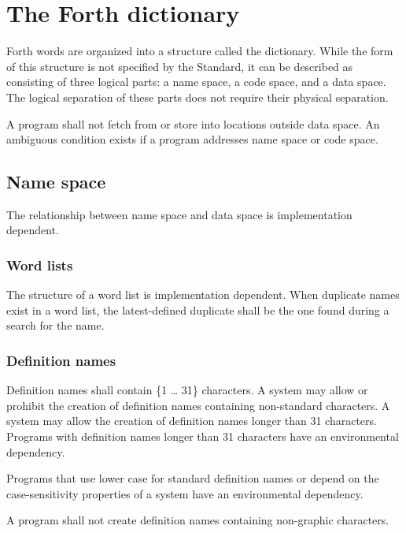 \section{The Forth dictionary} %
\label{usage:dict}

Forth words are organized into a structure called the dictionary.
While the form of this structure is not specified by the Standard,
it can be described as consisting of three logical parts:
a name space, a code space, and a data space. The logical separation
of these parts does not require their physical separation.

A program shall not fetch from or store into locations outside data
space. An ambiguous condition exists if a program addresses name
space or code space.

\subsection{Name space} %

The relationship between name space and data space is implementation
dependent.

\subsubsection{Word lists} %

The structure of a word list is implementation dependent. When
duplicate names exist in a word list, the latest-defined duplicate
shall be the one found during a search for the name.

\subsubsection{Definition names} %
\label{usage:names}

Definition names shall contain \{1 {\ldots} 31\} characters.
A system may allow or prohibit the creation of definition names
containing non-standard characters.  A system may allow the creation
of definition names longer than 31 characters.  Programs with
definition names longer than 31 characters have an environmental
dependency.

Programs that use lower case for standard definition names or depend
on the case-sensitivity properties of a system have an environmental
dependency.

A program shall not create definition names containing non-graphic
characters.


